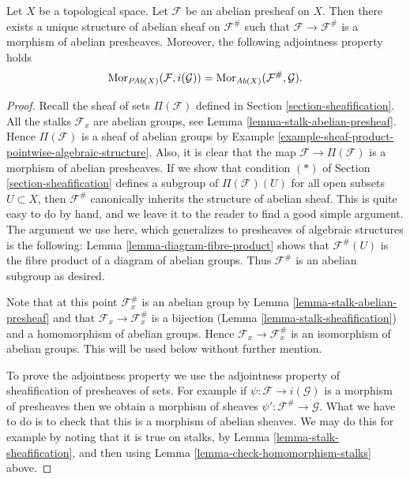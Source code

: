 \begin{lemma}
\label{lemma-sheafify-abelian-presheaf}
Let $X$ be a topological space.
Let $\mathcal{F}$ be an abelian presheaf on $X$.
Then there exists a unique structure of
abelian sheaf on $\mathcal{F}^\#$ such that
$\mathcal{F} \to \mathcal{F}^\#$ is a morphism
of abelian presheaves. Moreover, the following adjointness
property holds
$$
\mathop{\mathrm{Mor}}\nolimits_{\textit{PAb}(X)}(\mathcal{F}, i(\mathcal{G}))
=
\mathop{\mathrm{Mor}}\nolimits_{\textit{Ab}(X)}(\mathcal{F}^\#, \mathcal{G}).
$$
\end{lemma}

\begin{proof}
Recall the sheaf of sets $\Pi(\mathcal{F})$ defined in
Section \ref{section-sheafification}. All the stalks
$\mathcal{F}_x$ are abelian groups, see
Lemma \ref{lemma-stalk-abelian-presheaf}.
Hence $\Pi(\mathcal{F})$ is a sheaf of abelian groups by
Example \ref{example-sheaf-product-pointwise-algebraic-structure}.
Also, it is clear that the map $\mathcal{F} \to \Pi(\mathcal{F})$
is a morphism of abelian presheaves. If we show that
condition $(*)$ of Section \ref{section-sheafification} defines a subgroup
of $\Pi(\mathcal{F})(U)$ for all open subsets $U \subset X$,
then $\mathcal{F}^\#$ canonically inherits the structure of abelian sheaf.
This is quite easy to do by hand, and we leave it to the
reader to find a good simple argument. The argument we use here,
which generalizes to presheaves of algebraic structures is the following:
Lemma \ref{lemma-diagram-fibre-product} shows that
$\mathcal{F}^\#(U)$ is the fibre product of a diagram
of abelian groups. Thus $\mathcal{F}^\#$ is an abelian
subgroup as desired.

\medskip\noindent
Note that at this point $\mathcal{F}^\#_x$ is an abelian
group by Lemma \ref{lemma-stalk-abelian-presheaf}
and that $\mathcal{F}_x \to \mathcal{F}^\#_x$ is a
bijection (Lemma \ref{lemma-stalk-sheafification})
and a homomorphism of abelian groups. Hence
$\mathcal{F}_x \to \mathcal{F}^\#_x$ is an isomorphism
of abelian groups. This will be used below without further mention.

\medskip\noindent
To prove the adjointness property we use the adjointness
property of sheafification of presheaves of sets. For example
if $\psi : \mathcal{F} \to i(\mathcal{G})$ is a morphism of presheaves
then we obtain a morphism of sheaves
$\psi' : \mathcal{F}^\# \to \mathcal{G}$. What we have to do is to check
that this is a morphism of abelian sheaves. We may do this
for example by noting that it is true on stalks,
by Lemma \ref{lemma-stalk-sheafification}, and then using
Lemma \ref{lemma-check-homomorphism-stalks} above.
\end{proof}



